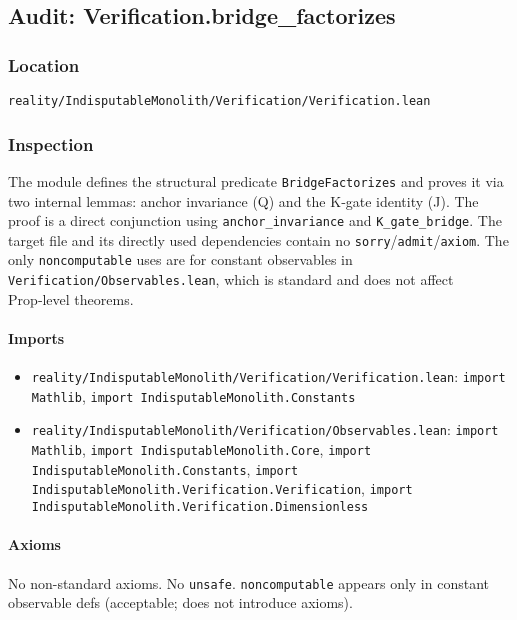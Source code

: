 \documentclass{article}
\newcommand{\FileRef}[1]{\texttt{#1}}
\begin{document}
\subsection{Audit: Verification.bridge\_factorizes}
\subsubsection{Location}
\FileRef{reality/IndisputableMonolith/Verification/Verification.lean}

\subsubsection{Inspection}
The module defines the structural predicate \texttt{BridgeFactorizes} and proves it via two internal lemmas: anchor invariance (Q) and the K‑gate identity (J). The proof is a direct conjunction using \texttt{anchor\_invariance} and \texttt{K\_gate\_bridge}. The target file and its directly used dependencies contain no \texttt{sorry}/\texttt{admit}/\texttt{axiom}. The only \texttt{noncomputable} uses are for constant observables in \texttt{Verification/Observables.lean}, which is standard and does not affect Prop‑level theorems.

\paragraph{Imports}
\begin{itemize}[leftmargin=*]
  \item \FileRef{reality/IndisputableMonolith/Verification/Verification.lean}: \texttt{import Mathlib}, \texttt{import IndisputableMonolith.Constants}
  \item \FileRef{reality/IndisputableMonolith/Verification/Observables.lean}: \texttt{import Mathlib}, \texttt{import IndisputableMonolith.Core}, \texttt{import IndisputableMonolith.Constants}, \texttt{import IndisputableMonolith.Verification.Verification}, \texttt{import IndisputableMonolith.Verification.Dimensionless}
\end{itemize}

\paragraph{Axioms}
No non-standard axioms. No \texttt{unsafe}. \texttt{noncomputable} appears only in constant observable defs (acceptable; does not introduce axioms).
\end{document}
